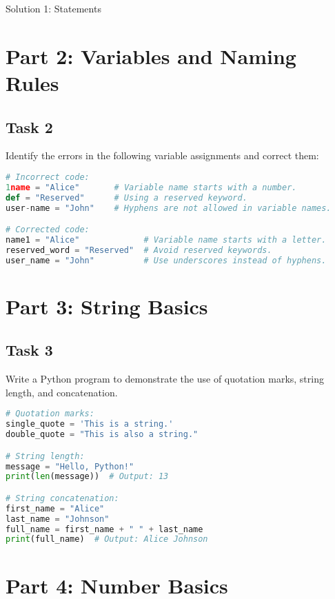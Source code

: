 \documentclass[11pt]{article}
\begin{document}
\begin{center}
    \Large{Solution 1: Statements}
\end{center}


\section*{Part 2: Variables and Naming Rules}

\subsection*{Task 2}
Identify the errors in the following variable assignments and correct them:

\begin{lstlisting}[language=Python]
# Incorrect code:
1name = "Alice"       # Variable name starts with a number.
def = "Reserved"      # Using a reserved keyword.
user-name = "John"    # Hyphens are not allowed in variable names.

# Corrected code:
name1 = "Alice"             # Variable name starts with a letter.
reserved_word = "Reserved"  # Avoid reserved keywords.
user_name = "John"          # Use underscores instead of hyphens.
\end{lstlisting}

\section*{Part 3: String Basics}

\subsection*{Task 3}
Write a Python program to demonstrate the use of quotation marks, string length, and concatenation.

\begin{lstlisting}[language=Python]
# Quotation marks:
single_quote = 'This is a string.'
double_quote = "This is also a string."

# String length:
message = "Hello, Python!"
print(len(message))  # Output: 13

# String concatenation:
first_name = "Alice"
last_name = "Johnson"
full_name = first_name + " " + last_name
print(full_name)  # Output: Alice Johnson
\end{lstlisting}

\newpage

\section*{Part 4: Number Basics}
\end{document}
